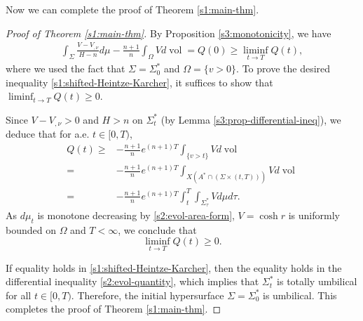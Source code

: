 \documentclass[11pt,reqno]{amsart}
\theoremstyle{definition}
\theoremstyle{remark}
\numberwithin{equation}{section}
\renewcommand{\(}{\left(}
\renewcommand{\)}{\right)}
\renewcommand{\~}{\widetilde}
\renewcommand{\-}{\overline}
\newcommand{\ra}{\rightarrow}
\newcommand{\vol}{\operatorname{vol}}
\begin{document}
Now we can complete the proof of Theorem \ref{s1:main-thm}.
\begin{proof}[Proof of Theorem \ref{s1:main-thm}]
	By Proposition \ref{s3:monotonicity}, we have
	\begin{align}\label{s3:comparison}
	\int_{\Sigma}\frac{V-V_{,\nu}}{H-n}d\mu-\frac{n+1}{n}\int_{\Omega}V d\vol=Q(0) \geq \liminf_{t\ra T} Q(t),
	\end{align}
    where we used the fact that $\Sigma=\Sigma_0^\ast$ and $\Omega=\{v>0\}$. To prove the desired inequality \eqref{s1:shifted-Heintze-Karcher}, it suffices to show that $\liminf_{t\ra T} Q(t)\geq 0$.

    Since $V-V_{,\nu}>0$ and $H>n$ on $\Sigma_t^\ast$ (by Lemma \ref{s3:prop-differential-ineq}), we deduce that for a.e. $t\in [0,T)$,
	\begin{align*}
	Q(t)\geq& -\frac{n+1}{n}e^{(n+1)T}\int_{\{v>t\}} V d\vol \\
	=&-\frac{n+1}{n}e^{(n+1)T}\int_{X(A^\ast\cap (\Sigma \times (t,T))) }V d\vol\\
	= &-\frac{n+1}{n}e^{(n+1)T}\int_{t}^{T} \int_{\Sigma_\tau^\ast}V d\mu d\tau.
	\end{align*}
	As $d\mu_t$ is monotone decreasing by \eqref{s2:evol-area-form}, $V=\cosh r$ is uniformly bounded on $\Omega$ and $T<\infty$, we conclude that
\begin{equation*}
  \liminf_{t\ra T}Q(t)\geq 0.
\end{equation*}

    If equality holds in \eqref{s1:shifted-Heintze-Karcher}, then the equality holds in the differential inequality \eqref{s2:evol-quantity}, which implies that $\Sigma_t^\ast$ is totally umbilical for all $t\in [0,T)$. Therefore, the initial hypersurface $\Sigma=\Sigma_0^\ast$ is umbilical. This completes the proof of Theorem \ref{s1:main-thm}.
\end{proof}
\end{document}
